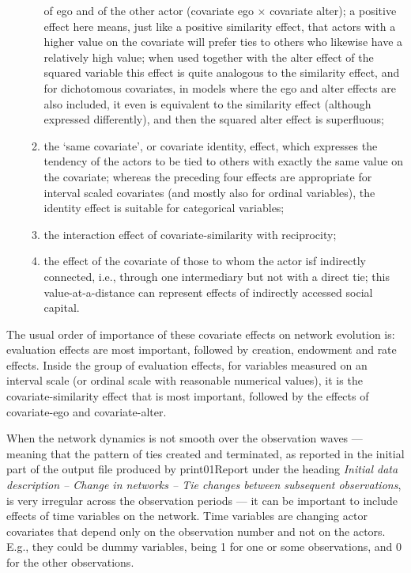 \documentclass[a4paper,fleqn,11pt]{article}
\newcommand{\+}{\, + \,}
\newcommand{\sfn}[1]{\textsf{#1}}
\begin{document}
\begin{itemize}
\begin{enumerate}
      of ego and of the other actor (covariate ego $\times$ covariate alter);
      a positive effect here means, just like a positive similarity effect,
      that actors with a higher value on the covariate
      will prefer ties to others who likewise have a relatively high
      value;
      when used together with the alter effect of the squared variable
      this effect is quite analogous to the similarity effect,
      and for dichotomous covariates, in models where the ego and
      alter effects are also included, it even is equivalent
      to the similarity effect (although expressed differently),
      and then the squared alter effect is superfluous;
\item the `same covariate', or covariate identity, effect, which expresses the tendency of the
      actors to be tied to others with exactly the same value on the covariate;
      whereas the preceding four effects are appropriate for interval scaled
      covariates (and mostly also for ordinal variables),
      the identity effect is suitable for categorical variables;
\item the interaction effect of covariate-similarity with reciprocity;
\item the effect of the covariate of those to whom the actor isf
      indirectly connected, i.e., through one intermediary but not
      with a direct tie; this value-at-a-distance can represent
      effects of indirectly accessed social capital.
\end{enumerate}
\end{itemize}
The usual order of importance of these covariate effects on
network evolution is: evaluation effects are most important, followed
by creation, endowment and rate effects. Inside the group of evaluation
effects, for variables measured on an interval scale
(or ordinal scale with reasonable numerical values),
it is the covariate-similarity effect that is most
important, followed by the effects of covariate-ego and
covariate-alter.

When the network dynamics is not smooth over the observation waves --- meaning that
the pattern of ties created and terminated, as reported in the initial part of the
output file produced by \sfn{print01Report}
under the heading \emph{Initial data description -- Change in networks --
Tie changes between subsequent observations},
is very irregular across the observation periods --- it can be important to include
effects of time variables on the network.
Time variables are changing actor covariates that depend only on the
observation number and not on the actors. E.g., they could be dummy variables,
being 1 for one or some observations, and 0 for the other observations.
\end{document}
